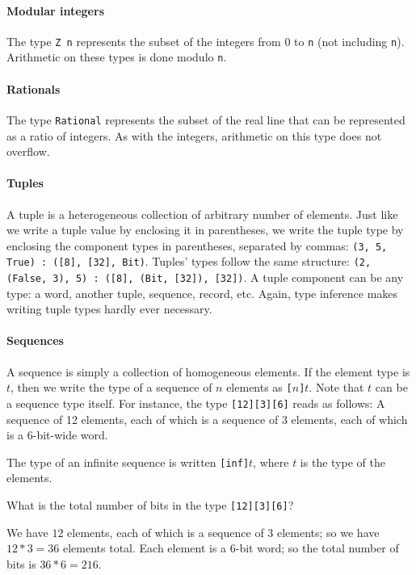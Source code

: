 \paragraph*{Modular integers} The type \texttt{Z n} represents
the subset of the integers from 0 to \texttt{n} (not including \texttt{n}).
Arithmetic on these types is done modulo \texttt{n}.

\paragraph*{Rationals}\indTheRationalType The type \texttt{Rational} represents
the subset of the real line that can be represented as a ratio of integers.
As with the integers, arithmetic on this type does not overflow.

\paragraph*{Tuples}\indTheTupleType A tuple is a heterogeneous
collection of arbitrary number of
elements. Just like we write a tuple value by enclosing it in
parentheses, we write the tuple type by enclosing the component types
in parentheses, separated by commas: \texttt{(3, 5, True) :\ ([8], [32],
  Bit)}. Tuples' types follow the same structure: \texttt{(2, (False, 3),
  5) :\ ([8], (Bit, [32]), [32])}.  A tuple component can be any type:
a word, another tuple, sequence, record, etc. Again, type inference
makes writing tuple types hardly ever necessary.\indTypeInference

\paragraph*{Sequences}\indTheSequenceType A sequence is simply a
collection of homogeneous elements. If the element type is $t$,
then we write the type of a sequence of $n$ elements as \texttt{[}$n$\texttt{]}$t$.
Note that $t$ can be a sequence type itself. For
instance, the type {\tt [12][3][6]} reads as follows: A sequence of
12 elements, each of which is a sequence of 3 elements, each of which
is a 6-bit-wide word.

The type of an infinite sequence is written \texttt{[inf]}$t$, where $t$
is the type of the elements.\indInfSeq \indInf

\begin{Exercise}\label{ex:types:1}
What is the total number of bits in the type {\tt [12][3][6]}?
\end{Exercise}
\begin{Answer}
  We have $12$ elements, each of which is a sequence of $3$ elements;
  so we have $12*3=36$ elements total. Each element is a 6-bit word;
  so the total number of bits is $36*6 = 216$.
\end{Answer}

